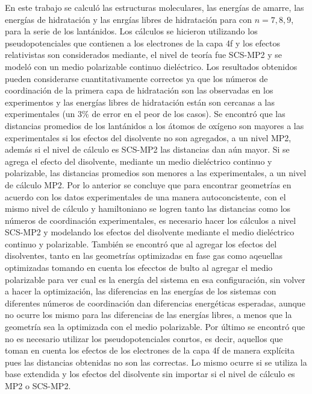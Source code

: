 En este trabajo se calcul\'o las estructuras moleculares, las 
energ\'ias de amarre, las energ\'ias de hidrataci\'on y las
enrg\'ias libres de hidrataci\'on para \lnoh con $n=7, 8, 9$, para
la serie de los lant\'anidos. Los c\'alculos se hicieron utilizando
los pseudopotenciales que contienen a los electrones de la capa 4f y
los efectos relativistas son considerados mediante, el nivel de 
teor\'ia fue SCS-MP2 y se model\'o con un medio polarizable continuo
diel\'ectrico. Los resultados obtenidos pueden considerarse 
cuantitativamente correctos ya que los n\'umeros de coordinaci\'on de
la primera capa de hidrataci\'on son las observadas en los 
experimentos y las energ\'ias libres de hidrataci\'on est\'an son
cercanas a las experimentales (un 3\% de error en el peor de los 
casos). Se encontr\'o que las distancias promedios de los 
lant\'anidos a los \'atomos de ox\'igeno son mayores a las 
experimentales si los efectos del disolvente no son agregados, a un 
nivel MP2, adem\'as si el nivel de c\'alculo es SCS-MP2 las 
distancias dan a\'un mayor. Si se agrega el efecto del disolvente, 
mediante un medio diel\'ectrico continuo y polarizable, las 
distancias promedios son menores a las experimentales, a un nivel de 
c\'alculo MP2. Por lo anterior se concluye que para encontrar 
geometr\'ias en acuerdo con los datos experimentales de una manera 
autoconcistente, con el mismo nivel de c\'alculo y hamiltoniano se 
logren tanto las distancias como los n\'umeros de coordinaci\'on 
experimentales, es necesario hacer los c\'alculos a nivel SCS-MP2 y
modelando los efectos del disolvente mediante el medio diel\'ectrico
continuo y polarizable. Tambi\'en se encontr\'o que al agregar los
efectos del disolventes, tanto en las geometr\'ias optimizadas en 
fase gas como aqeuellas optimizadas tomando en cuenta los efecctos de
bulto al agregar el medio polarizable para ver cual es la energ\'ia 
del sistema en esa configuraci\'on, sin volver a hacer la 
optimizaci\'on, las diferencias en las energ\'ias de los sistemas con
diferentes n\'umeros de coordinaci\'on dan diferencias energ\'eticas
esperadas, aunque no ocurre los mismo para las diferencias de las 
energ\'ias libres, a menos que la geometr\'ia sea la optimizada con
el medio polarizable. Por \'ultimo se encontr\'o que no es necesario
utilizar los pseudopotenciales conrtos, es decir, aquellos que toman
en cuenta los efectos de los electrones de la capa 4f de manera 
expl\'icita pues las distancias obtenidas no son las correctas. Lo
mismo ocurre si se utiliza la base extendida y los efectos del 
disolvente sin importar si el nivel de c\'alculo es MP2 o SCS-MP2. 


